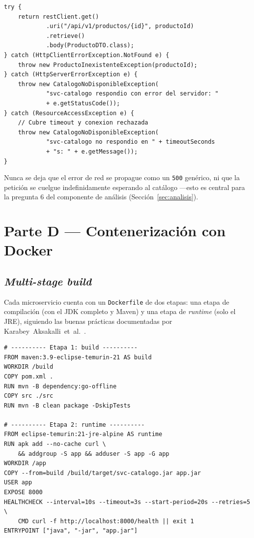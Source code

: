 \documentclass[11pt,a4paper]{article}
\begin{document}
\begin{lstlisting}[caption={Captura y traducción de fallos de red a excepciones de dominio}, label={lst:catchfallos}]
try {
    return restClient.get()
            .uri("/api/v1/productos/{id}", productoId)
            .retrieve()
            .body(ProductoDTO.class);
} catch (HttpClientErrorException.NotFound e) {
    throw new ProductoInexistenteException(productoId);
} catch (HttpServerErrorException e) {
    throw new CatalogoNoDisponibleException(
            "svc-catalogo respondio con error del servidor: "
            + e.getStatusCode());
} catch (ResourceAccessException e) {
    // Cubre timeout y conexion rechazada
    throw new CatalogoNoDisponibleException(
            "svc-catalogo no respondio en " + timeoutSeconds
            + "s: " + e.getMessage());
}
\end{lstlisting}

Nunca se deja que el error de red se propague como un \texttt{500} genérico,
ni que la petición se cuelgue indefinidamente esperando al catálogo —esto es
central para la pregunta 6 del componente de análisis (Sección~\ref{sec:analisis}).

\section{Parte D — Contenerización con Docker}

\subsection{\emph{Multi-stage build}}

Cada microservicio cuenta con un \texttt{Dockerfile} de dos etapas: una etapa
de compilación (con el JDK completo y Maven) y una etapa de \emph{runtime}
(solo el JRE), siguiendo las buenas prácticas documentadas por
Karabey~Aksakalli~et~al.~\cite{aksakalli2021}.

\begin{lstlisting}[language={}, basicstyle=\ttfamily\footnotesize, caption={Dockerfile multi-stage de \texttt{svc-catalogo}}, label={lst:dockerfile}]
# ---------- Etapa 1: build ----------
FROM maven:3.9-eclipse-temurin-21 AS build
WORKDIR /build
COPY pom.xml .
RUN mvn -B dependency:go-offline
COPY src ./src
RUN mvn -B clean package -DskipTests

# ---------- Etapa 2: runtime ----------
FROM eclipse-temurin:21-jre-alpine AS runtime
RUN apk add --no-cache curl \
    && addgroup -S app && adduser -S app -G app
WORKDIR /app
COPY --from=build /build/target/svc-catalogo.jar app.jar
USER app
EXPOSE 8000
HEALTHCHECK --interval=10s --timeout=3s --start-period=20s --retries=5 \
    CMD curl -f http://localhost:8000/health || exit 1
ENTRYPOINT ["java", "-jar", "app.jar"]
\end{lstlisting}
\end{document}
